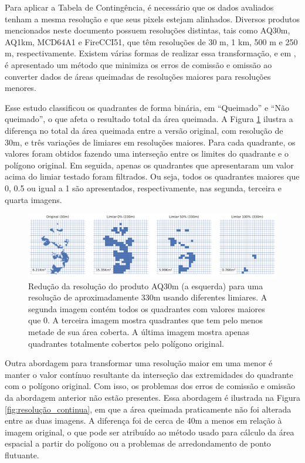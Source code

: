\documentclass[cic,tc]{iiufrgs}
\begin{document}
Para aplicar a Tabela de Contingência, é necessário que os dados avaliados tenham a mesma resolução e que seus pixels estejam alinhados. Diversos produtos mencionados neste documento possuem resoluções distintas, tais como AQ30m, AQ1km, MCD64A1 e FireCCI51, que têm resoluções de 30 m, 1 km, 500 m e 250 m, respectivamente. Existem várias formas de realizar essa transformação, e em \citet{BOSCHETTI2004280}, é apresentado um método que minimiza os erros de comissão e omissão ao converter dados de áreas queimadas de resoluções maiores para resoluções menores.

Esse estudo classificou os quadrantes de forma binária, em ``Queimado'' e ``Não queimado'', o que afeta o resultado total da área queimada. A Figura \ref{fig:diferenca_resoluções} ilustra a diferença no total da área queimada entre a versão original, com resolução de 30m, e três variações de limiares em resoluções maiores. Para cada quadrante, os valores foram obtidos fazendo uma interseção entre os limites do quadrante e o polígono original. Em seguida, apenas os quadrantes que apresentaram um valor acima do limiar testado foram filtrados. Ou seja, todos os quadrantes maiores que 0, 0.5 ou igual a 1 são apresentados, respectivamente, nas segunda, terceira e quarta imagens.

\begin{figure}[!htb]
    \caption{Redução da resolução do produto AQ30m (a esquerda) para uma resolução de aproximadamente 330m usando diferentes limiares. A segunda imagem contém todos os quadrantes com valores maiores que 0. A terceira imagem mostra quadrantes que tem pelo menos metade de sua área coberta. A última imagem mostra apenas quadrantes totalmente cobertos pelo polígono original.}
    \begin{center}
        \includegraphics[width=35em]{diferenca_resoluções}
    \end{center}
    \label{fig:diferenca_resoluções}
\end{figure}

Outra abordagem para transformar uma resolução maior em uma menor é manter o valor contínuo resultante da interseção das extremidades do quadrante com o polígono original. Com isso, os problemas dos erros de comissão e omissão da abordagem anterior não estão presentes. Essa abordagem é ilustrada na Figura \ref{fig:resolução_continua}, em que a área queimada praticamente não foi alterada entre as duas imagens. A diferença foi de cerca de 40m a menos em relação à imagem original, o que pode ser atribuído ao método usado para cálculo da área espacial a partir do polígono ou a problemas de arredondamento de ponto flutuante.
\end{document}
